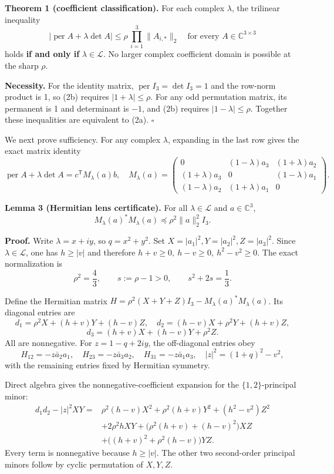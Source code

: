 \documentclass[11pt]{article}
\begin{document}
\textbf{Theorem 1 (coefficient classification).} For each complex
\(\lambda\), the trilinear inequality \[
\boxed{\quad
|\operatorname{per}A+\lambda\det A|
\le\rho\,\prod_{i=1}^3\|A_{i,*}\|_2
\quad\text{for every }A\in\mathbb C^{3\times3}
\quad}\tag{2b}
\] holds \textbf{if and only if} \(\lambda\in\mathcal L\). No larger
complex coefficient domain is possible at the sharp \(\rho\).

\textbf{Necessity.} For the identity matrix,
\(\operatorname{per}I_3=\det I_3=1\) and the row-norm product is 1, so
(2b) requires \(|1+\lambda|\le\rho\). For any odd permutation matrix,
its permanent is 1 and determinant is \(-1\), and (2b) requires
\(|1-\lambda|\le\rho\). Together these inequalities are equivalent to
(2a). \(\square\)

We next prove sufficiency. For any complex \(\lambda\), expanding in the
last row gives the exact matrix identity \[
\operatorname{per}A+\lambda\det A
=c^{\mathsf T}M_\lambda(a)b,
\quad
M_\lambda(a)=
\begin{pmatrix}
0&(1-\lambda)a_3&(1+\lambda)a_2\\
(1+\lambda)a_3&0&(1-\lambda)a_1\\
(1-\lambda)a_2&(1+\lambda)a_1&0
\end{pmatrix}.
\tag{2}
\]

\textbf{Lemma 3 (Hermitian lens certificate).} For all
\(\lambda\in\mathcal L\) and \(a\in\mathbb C^3\), \[
M_\lambda(a)^*M_\lambda(a)
\preceq\rho^2\|a\|_2^2I_3.
\tag{3}
\]

\textbf{Proof.} Write \(\lambda=x+iy\), so \(q=x^2+y^2\). Set
\(X=|a_1|^2,Y=|a_2|^2,Z=|a_3|^2\). Since \(\lambda\in\mathcal L\), one
has \(h\ge|v|\) and therefore \(h+v\ge0,\ h-v\ge0,\ h^2-v^2\ge0\). The
exact normalization is \[
\rho^2=\frac43,\qquad s:=\rho-1>0,\qquad
s^2+2s=\frac13.
\tag{4}
\]

Define the Hermitian matrix
\(H=\rho^2(X+Y+Z)I_3-M_\lambda(a)^*M_\lambda(a)\). Its diagonal entries
are \[
d_1=\rho^2X+(h+v)Y+(h-v)Z,\quad
d_2=(h-v)X+\rho^2Y+(h+v)Z,
\] \[
d_3=(h+v)X+(h-v)Y+\rho^2Z.
\tag{5}
\] All are nonnegative. For \(z=1-q+2iy\), the off-diagonal entries obey
\[
H_{12}=-z\bar a_2a_1,\quad
H_{23}=-z\bar a_3a_2,\quad
H_{31}=-z\bar a_1a_3,
\quad
|z|^2=(1+q)^2-v^2,
\tag{6}
\] with the remaining entries fixed by Hermitian symmetry.

Direct algebra gives the nonnegative-coefficient expansion for the
\(\{1,2\}\)-principal minor: \[
\boxed{
\begin{aligned}
d_1d_2-|z|^2XY={}&
\rho^2(h-v)X^2+\rho^2(h+v)Y^2+(h^2-v^2)Z^2\\
&+2\rho^2hXY
+\bigl(\rho^2(h+v)+(h-v)^2\bigr)XZ\\
&+\bigl((h+v)^2+\rho^2(h-v)\bigr)YZ .
\end{aligned}}
\tag{7}
\] Every term is nonnegative because \(h\ge|v|\). The other two
second-order principal minors follow by cyclic permutation of \(X,Y,Z\).
\end{document}
